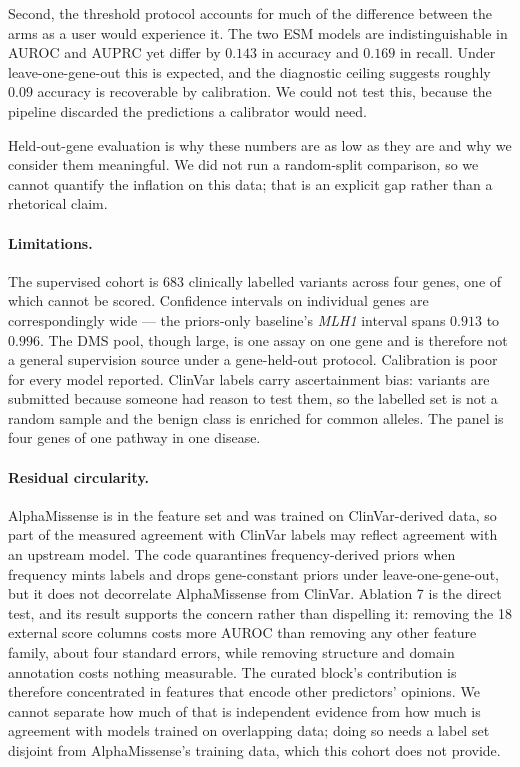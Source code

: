 \documentclass{bioinfo}
\newcommand{\gene}[1]{\textit{#1}}
\begin{document}
Second, the threshold protocol accounts for much of the difference between the
arms as a user would experience it. The two ESM models are indistinguishable in
AUROC and AUPRC yet differ by $0.143$ in accuracy and $0.169$ in recall. Under
leave-one-gene-out this is expected, and the diagnostic ceiling suggests roughly
$0.09$ accuracy is recoverable by calibration. We could not test this, because
the pipeline discarded the predictions a calibrator would need.

Held-out-gene evaluation is why these numbers are as low as they are and why we
consider them meaningful. We did not run a random-split comparison, so we cannot
quantify the inflation on this data; that is an explicit gap rather than a
rhetorical claim.

\paragraph{Limitations.}
The supervised cohort is 683 clinically labelled variants across four genes, one
of which cannot be scored. Confidence intervals on individual genes are
correspondingly wide --- the priors-only baseline's \gene{MLH1} interval spans
$0.913$ to $0.996$. The DMS pool, though large, is one assay on one gene and is
therefore not a general supervision source under a gene-held-out protocol.
Calibration is poor for every model reported. ClinVar labels carry ascertainment
bias: variants are submitted because someone had reason to test them, so the
labelled set is not a random sample and the benign class is enriched for common
alleles. The panel is four genes of one pathway in one disease.

\paragraph{Residual circularity.}
AlphaMissense is in the feature set and was trained on ClinVar-derived data, so
part of the measured agreement with ClinVar labels may reflect agreement with an
upstream model. The code quarantines frequency-derived priors when frequency
mints labels and drops gene-constant priors under leave-one-gene-out, but it
does not decorrelate AlphaMissense from ClinVar. Ablation 7 is the direct test,
and its result supports the concern rather than dispelling it: removing the 18
external score columns costs more AUROC than removing any other feature family,
about four standard errors, while removing structure and domain annotation costs
nothing measurable. The curated block's contribution is therefore concentrated
in features that encode other predictors' opinions. We cannot separate how much
of that is independent evidence from how much is agreement with models trained
on overlapping data; doing so needs a label set disjoint from AlphaMissense's
training data, which this cohort does not provide.
\end{document}
